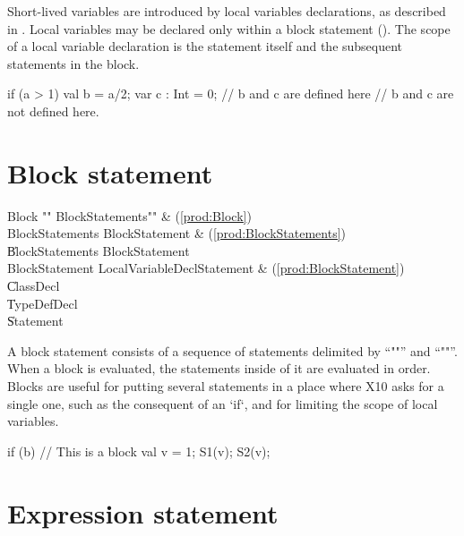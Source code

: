 Short-lived variables are introduced by local variables declarations, as
described in . Local variables may be declared only
within a block statement (). The scope of a local variable
declaration is the statement itself and the subsequent statements in the
block.
\begin{xten}
  if (a > 1) {
     val b = a/2;
     var c : Int = 0;
     // b and c are defined here
  }
  // b and c are not defined here.
\end{xten}


\section{Block statement}
\label{Blocks}

\begin{bbgrammar}
 Block    \: \xcd"{" BlockStatements\opt \xcd"}" & (\ref{prod:Block})\\%
 BlockStatements    \: BlockStatement & (\ref{prod:BlockStatements})\\%
    \| BlockStatements BlockStatement\\
 BlockStatement    \: LocalVariableDeclStatement & (\ref{prod:BlockStatement})\\%
    \| ClassDecl\\
    \| TypeDefDecl\\
    \| Statement\\
\end{bbgrammar}


A block statement consists of a sequence of statements delimited by
``\xcd"{"'' and ``\xcd"}"''. When a block is evaluated, the statements inside
of it are evaluated in order.  Blocks are useful for putting several
statements in a place where X10 asks for a single one, such as the consequent
of an \xcd`if`, and for limiting the scope of local variables.
\begin{xten}
if (b) {
  // This is a block
  val v = 1;
  S1(v); 
  S2(v);
}
\end{xten}



\section{Expression statement}

